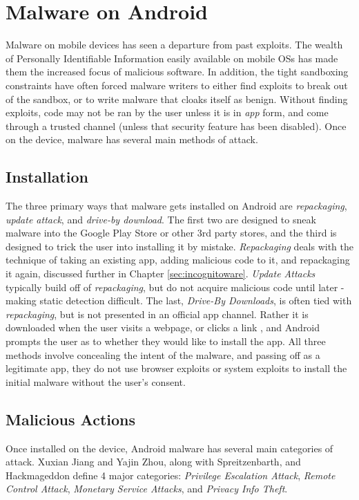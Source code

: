 \chapter{Malware on Android}
\label{sec:malware}

Malware on mobile devices has seen a departure from past exploits. The wealth of Personally Identifiable Information easily available on mobile OSs has made them the increased focus of malicious software. In addition, the tight sandboxing constraints have often forced malware writers to either find exploits to break out of the sandbox, or to write malware that cloaks itself as benign. Without finding exploits, code may not be ran by the user unless it is in \textit{app} form, and come through a trusted channel (unless that security feature has been disabled). Once on the device, malware has several main methods of attack.

\section{Installation}
The three primary ways that malware gets installed on Android are \textit{repackaging}, \textit{update attack}, and \textit{drive-by download}\citep{zhou2012dissecting}. The first two are designed to sneak malware into the Google Play Store or other 3rd party stores, and the third is designed to trick the user into installing it by mistake. \textit{Repackaging} deals with the technique of taking an existing app, adding malicious code to it, and repackaging it again, discussed further in Chapter \ref{sec:incognitoware}. \textit{Update Attacks} typically build off of \textit{repackaging}, but do not acquire malicious code until later - making static detection difficult\citep{zhou2012dissecting}. The last, \textit{Drive-By Downloads}, is often tied with \textit{repackaging}, but is not presented in an official app channel. Rather it is downloaded when the user visits a webpage, or clicks a link \citep{zhou2012dissecting}, and Android prompts the user as to whether they would like to install the app. All three methods involve concealing the intent of the malware, and passing off as a legitimate app, they do not use browser exploits or system exploits to install the initial malware without the user's consent.

\section{Malicious Actions}
Once installed on the device, Android malware has several main categories of attack. Xuxian Jiang
 and Yajin Zhou\citep{zhou2012dissecting}, along with Spreitzenbarth\citep{spreitzenbarth2013}, and Hackmageddon\citep{hackmageddon2011} define 4 major categories: \textit{Privilege Escalation Attack}, \textit{Remote Control Attack}, \textit{Monetary Service Attacks}, and \textit{Privacy Info Theft}. 


